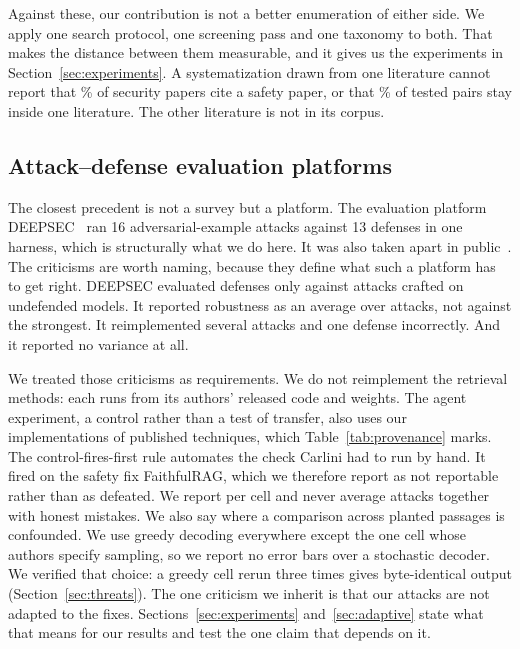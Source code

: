 Against these, our contribution is not a better enumeration of either side. We
apply one search protocol, one screening pass and one taxonomy to both. That
makes the distance between them measurable, and it gives us the experiments in
Section~\ref{sec:experiments}. A systematization drawn from one literature cannot report that
\PctSecCitesSafety{}\% of security papers cite a safety paper,
or that \PctSameRegime{}\% of tested pairs stay inside one literature. The other
literature is not in its corpus.

\subsection{Attack--defense evaluation platforms}

The closest precedent is not a survey but a platform.
The evaluation platform DEEPSEC~\cite{ling-2019-deepsec} ran 16 adversarial-example attacks against 13
defenses in one harness, which is structurally what we do here. It was also
taken apart in public~\cite{carlini-2019-critique}. The criticisms are worth
naming, because they define what such a platform has to get right. DEEPSEC
evaluated defenses only against attacks crafted on undefended models. It
reported robustness as an average over attacks, not against the strongest. It
reimplemented several attacks and one defense incorrectly. And it reported no
variance at all.

We treated those criticisms as requirements. We do not reimplement the retrieval methods: each runs from its authors' released code and weights. The agent experiment, a control rather than a test of transfer, also uses our implementations of published techniques, which Table~\ref{tab:provenance} marks. The control-fires-first rule
automates the check Carlini had to run by hand. It fired on the safety fix FaithfulRAG, which
we therefore report as not reportable rather than as defeated. We report per
cell and never average attacks together with honest mistakes. We also say where a comparison across planted
passages is confounded. We use greedy decoding everywhere except the one cell whose authors
specify sampling, so we report no error bars over a stochastic decoder. We
verified that choice: a greedy cell rerun three times gives byte-identical
output (Section~\ref{sec:threats}). The one criticism we inherit is that our attacks are not adapted to the
fixes. Sections~\ref{sec:experiments} and~\ref{sec:adaptive} state what
that means for our results and test the one claim that depends on it.

